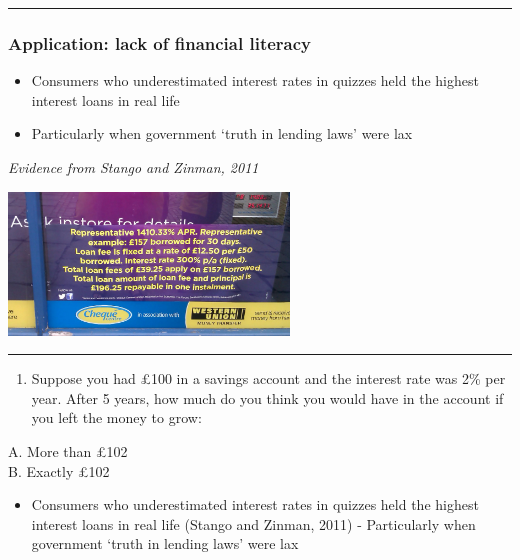 \documentclass[]{article}
\providecommand{\tightlist}{%
  \setlength{\itemsep}{0pt}\setlength{\parskip}{0pt}}
\begin{document}
\begin{center}\rule{0.5\linewidth}{\linethickness}\end{center}

\hypertarget{application-lack-of-financial-literacy}{%
\subsubsection{Application: lack of financial literacy}\label{application-lack-of-financial-literacy}}

\begin{itemize}
\tightlist
\item
  Consumers who underestimated interest rates in quizzes held the highest interest loans in real life
\item
  Particularly when government `truth in lending laws' were lax
\end{itemize}

\emph{Evidence from Stango and Zinman, 2011}

\includegraphics[height=1.5in]{picsfigs/paydayloan.png}

\begin{center}\rule{0.5\linewidth}{\linethickness}\end{center}

\begin{enumerate}
\def\labelenumi{\arabic{enumi}.}
\tightlist
\item
  Suppose you had \pounds100 in a savings account and the interest rate was 2\% per year. After 5 years, how much do you think you would have in the account if you left the money to grow:~
\end{enumerate}

A. More than \pounds102\\

B. Exactly \pounds102\\

\begin{itemize}
\tightlist
\item
  Consumers who underestimated interest rates in quizzes held the highest interest loans in real life (Stango and Zinman, 2011)
  - Particularly when government `truth in lending laws' were lax
\end{itemize}
\end{document}
